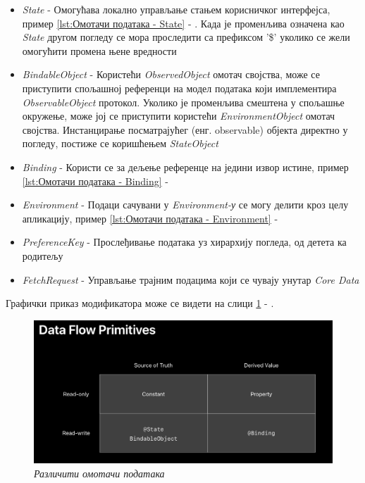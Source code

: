 \documentclass[12pt,oneside]{memoir}
\begin{document}
\begin{itemize}
    \item \textit{State} - Омогућава локално управљање стањем корисничког интерфејса, пример \ref{lst:Омотачи података - State} - . Када је променљива означена као \textit{State} другом погледу се мора проследити са префиксом '\$' уколико се жели омогућити промена њене вредности
    \item \textit{BindableObject} - Користећи \textit{ObservedObject} омотач својства, може се приступити спољашној референци на модел података који имплементира \textit{ObservableObject} протокол. Уколико је променљива смештена у спољашње окружење, може јој се приступити користећи \textit{EnvironmentObject} омотач својства. Инстанцирање посматрајућег (енг. observable) објекта директно у погледу, постиже се коришћењем \textit{StateObject}
    \item \textit{Binding} - Користи се за дељење референце на једини извор истине, пример \ref{lst:Омотачи података - Binding} - 
    \item \textit{Environment} - Подаци сачувани у \textit{Environment-у} се могу делити кроз целу апликацију, пример \ref{lst:Омотачи података - Environment} - 
    \item \textit{PreferenceKey} - Прослеђивање података уз хирархију погледа, од детета ка родитељу
    \item \textit{FetchRequest} - Управљање трајним подацима који се чувају унутар \textit{Core Data}
\end{itemize}

Графички приказ модификатора може се видети на слици \ref{slika:data_flow_primitives} - .

\begin{figure}[H]
\includegraphics[width=1\textwidth]{images/DataFlowPrimitives.png}
\centering
\caption{\textit{Различити омотачи података}}
\label{slika:data_flow_primitives}
\end{figure}
\end{document}
